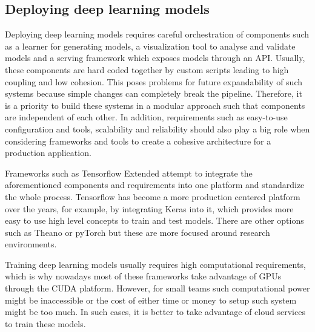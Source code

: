\documentclass[journal,compsoc]{IEEEtran}
\begin{document}
\subsection{Deploying deep learning models}
Deploying deep learning models requires careful orchestration of components such as a learner for generating models, a visualization tool to analyse and validate models and a serving framework which exposes models through an API. Usually, these components are hard coded together by custom scripts leading to high coupling and low cohesion. This poses problems for future expandability of such systems because simple changes can completely break the pipeline. Therefore, it is a priority to build these systems in a modular approach such that components are independent of each other. In addition, requirements such as easy-to-use configuration and tools, scalability and reliability should also play a big role when considering frameworks and tools to create a cohesive architecture for a production application. \par
Frameworks such as Tensorflow Extended\cite{Baylor2017} attempt to integrate the aforementioned components and requirements into one platform and standardize the whole process. Tensorflow has become a more production centered platform over the years, for example, by integrating Keras\cite{chollet2015keras} into it, which provides more easy to use high level concepts to train and test models. There are other options such as Theano\cite{Bastien} or pyTorch\cite{pytorch} but these are more focused around research environments. \par   
Training deep learning models usually requires high computational requirements, which is why nowadays most of these frameworks take advantage of GPUs through the CUDA platform. However, for small teams such computational power might be inaccessible or the cost of either time or money to setup such system might be too much. In such cases, it is better to take advantage of cloud services to train these models.  
\end{document}
